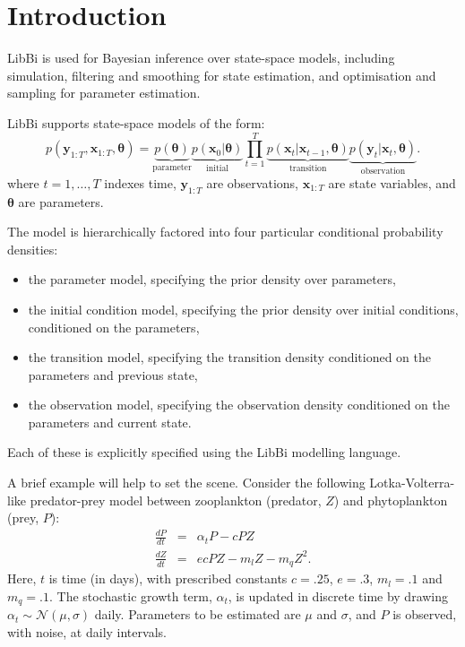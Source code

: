 \section{Introduction\label{Introduction}}

LibBi is used for Bayesian inference over state-space models, including
simulation, filtering and smoothing for state estimation, and optimisation and
sampling for parameter estimation.

LibBi supports state-space models of the form:
\begin{equation*}
p(\mathbf{y}_{1:T},\mathbf{x}_{1:T},\boldsymbol{\theta}) =
\underbrace{p(\boldsymbol{\theta})}_{\text{parameter}}
\underbrace{p(\mathbf{x}_0|\boldsymbol{\theta})}_{\text{initial}}
\prod_{t=1}^T
\underbrace{p(\mathbf{x}_t|\mathbf{x}_{t-1},\boldsymbol{\theta})}_{\text{transition}}
\underbrace{p(\mathbf{y}_t|\mathbf{x}_t,\boldsymbol{\theta})}_{\text{observation}}.
\end{equation*}
where $t = 1,\ldots,T$ indexes time, $\mathbf{y}_{1:T}$ are observations,
$\mathbf{x}_{1:T}$ are state variables, and $\boldsymbol{\theta}$ are
parameters.

The model is hierarchically factored into four particular conditional
probability densities:
\begin{itemize}
\item the parameter model, specifying the prior density over parameters,
\item the initial condition model, specifying the prior density over initial
  conditions, conditioned on the parameters,
\item the transition model, specifying the transition density conditioned on
  the parameters and previous state,
\item the observation model, specifying the observation density conditioned on
  the parameters and current state.
\end{itemize}
Each of these is explicitly specified using the LibBi modelling
language.

A brief example will help to set the scene. Consider the following
Lotka-Volterra-like predator-prey
model between zooplankton (predator, $Z$) and phytoplankton (prey, $P$):
\begin{eqnarray*}
\frac{dP}{dt} &=& \alpha_t P - cPZ\\
\frac{dZ}{dt} &=& ecPZ - m_lZ - m_q Z^2.
\end{eqnarray*}
Here, $t$ is time (in days), with prescribed constants $c = .25$, $e = .3$,
$m_l = .1$ and $m_q = .1$. The stochastic growth term, $\alpha_t$, is updated
in discrete time by drawing $\alpha_t \sim \mathcal{N}(\mu,\sigma)$
daily. Parameters to be estimated are $\mu$ and $\sigma$, and $P$ is observed,
with noise, at daily intervals.

